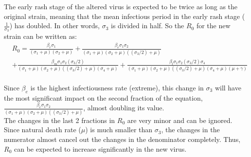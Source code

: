 The early rash stage of the altered virus is expected to be twice as long as the original strain, meaning that the mean infectious period in the early rash stage ($\frac{1}{\sigma_3}$) has doubled. In other words, $\sigma_3$ is divided in half. So the $R_0$ for the new strain can be written as: 
\begin{align*}
&R_0 = \frac{\beta_r \sigma_{1}}{{\left(\sigma_{1} + \mu\right)} {\left(\sigma_{2} + \mu\right)}} + \frac{\beta_e \sigma_{1} \sigma_{2}}{{\left(\sigma_{1} + \mu\right)} {\left(\sigma_{2} + \mu\right)} {\left((\sigma_{3}/2) + \mu\right)}}\\ 
&+ \frac{\beta_m \sigma_{1} \sigma_{2} (\sigma_{3}/2)}{{\left(\sigma_{1} + \mu\right)} {\left(\sigma_{2} + \mu\right)} {\left((\sigma_{3}/2) + \mu\right)} {\left(\sigma_{4} + \mu\right)}} + \frac{\beta_l \sigma_{1} \sigma_{2} (\sigma_{3}/2) \sigma_{4}}{{\left(\sigma_{1} + \mu\right)} {\left(\sigma_{2} + \mu\right)} {\left((\sigma_{3}/2) + \mu\right)} {\left(\sigma_{4} + \mu\right)} {\left(\mu + \gamma\right)}}
\end{align*}\\
Since $\beta_e$ is the highest infectiousness rate (extreme), this change in $\sigma_3$ will have the most significant impact on the second fraction of the equation, $\frac{\beta_e \sigma_{1} \sigma_{2}}{{\left(\sigma_{1} + \mu\right)} {\left(\sigma_{2} + \mu\right)} {\left((\sigma_{3}/2) + \mu\right)}}$, almost doubling its value. \\ 
The changes in the last 2 fractions in $R_0$ are very minor and can be ignored. Since natural death rate ($\mu$) is much smaller than $\sigma_3$, the changes in the numerator almost cancel out the changes in the denominator completely. Thus, $R_0$ can be expected to increase significantly in the new virus.
